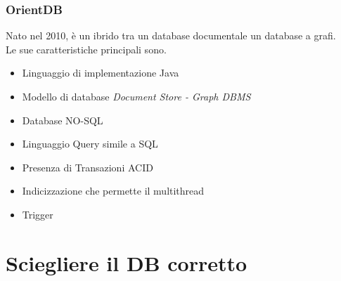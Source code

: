 \documentclass{beamer}
\begin{document}

\begin{frame}
\frametitle{OrientDB}
Nato nel 2010, è un ibrido tra un database documentale un database a grafi.\\
Le sue caratteristiche principali sono.
\begin{itemize}
\item Linguaggio di implementazione Java
\item Modello di database \emph{Document Store - Graph DBMS}
\item Database NO-SQL 
\item Linguaggio Query simile a SQL
\item Presenza di Transazioni ACID
\item Indicizzazione che permette il multithread
\item Trigger
\end{itemize}
\end{frame}

\section{Sciegliere il DB corretto}
\end{document}
